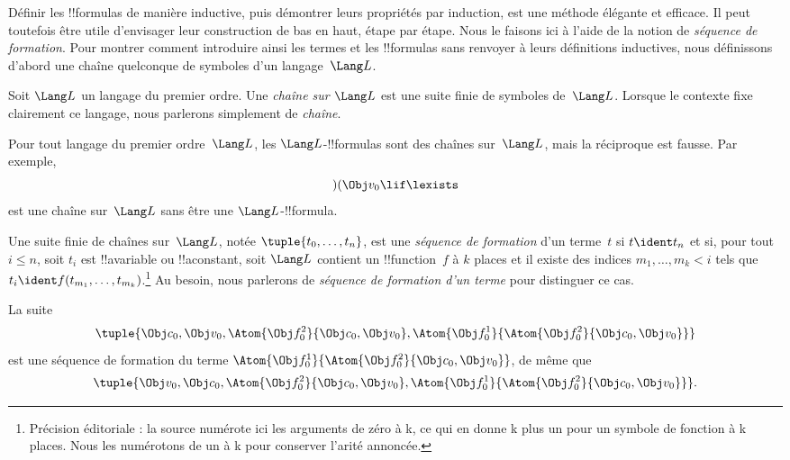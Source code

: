 \documentclass[../../../include/open-logic-section]{subfiles}
\begin{document}


Définir les !!{formula}s de manière inductive, puis démontrer leurs
propriétés par induction, est une méthode élégante et efficace. Il
peut toutefois être utile d'envisager leur construction de bas en
haut, étape par étape. Nous le faisons ici à l'aide de la notion de
\emph{séquence de formation}.
%
Pour montrer comment introduire ainsi les termes et les !!{formula}s
sans renvoyer à leurs définitions inductives, nous définissons
d'abord une chaîne quelconque de symboles d'un langage~$\Lang L$.

\begin{defn}
Soit $\Lang L$ un langage du premier ordre. Une \emph{chaîne sur
$\Lang L$} est une suite finie de symboles de~$\Lang L$. Lorsque
le contexte fixe clairement ce langage, nous parlerons simplement
de \emph{chaîne}.
\end{defn}

\begin{ex}
Pour tout langage du premier ordre~$\Lang L$, les
$\Lang L$-!!{formula}s sont des chaînes sur~$\Lang L$, mais la
réciproque est fausse. Par exemple, \[)(\Obj v_0\lif\lexists\] est une
chaîne sur~$\Lang L$ sans être une $\Lang L$-!!{formula}.
\end{ex}

\begin{defn}
Une suite finie de chaînes sur~$\Lang L$, notée
$\tuple{t_0,\dotsc,t_n}$, est une \emph{séquence de formation}
d'un terme~$t$ si $t \ident t_n$ et si, pour tout $i \leq n$, soit
$t_i$ est !!a{variable} ou !!a{constant}, soit $\Lang L$ contient
un !!{function}~$f$ à $k$ places et il existe des indices
$m_1,\dotsc,m_k < i$ tels que
$t_i \ident f(t_{m_1},\dotsc,t_{m_k})$.\footnote{Précision éditoriale : la source numérote ici les arguments de zéro à k, ce qui en donne k plus un pour un symbole de fonction à k places. Nous les numérotons de un à k pour conserver l'arité annoncée.} Au besoin, nous parlerons
de \emph{séquence de formation d'un terme} pour distinguer ce cas.
\end{defn}

\begin{ex}
La suite
\[
    \tuple{\Obj c_0, \Obj v_0, \Atom{\Obj f^2_0}{\Obj c_0, \Obj v_0}, \Atom{\Obj f^1_0}{\Atom{\Obj f^2_0}{\Obj c_0, \Obj v_0}}}
\]
est une séquence de formation du terme
$\Atom{\Obj f^1_0}{\Atom{\Obj f^2_0}{\Obj c_0, \Obj v_0}}$,
de même que
\[
    \tuple{\Obj v_0, \Obj c_0, \Atom{\Obj f^2_0}{\Obj c_0, \Obj v_0}, \Atom{\Obj f^1_0}{\Atom{\Obj f^2_0}{\Obj c_0, \Obj v_0}}}.
\]
\end{ex}
\end{document}
